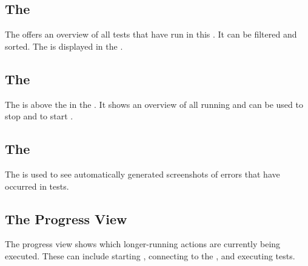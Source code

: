 \subsection{The \gdtestsummaryview{}}
The \gdtestsummaryview{} offers an overview of all tests that have run in this \gddb{}. It can be filtered and sorted.  The \gdtestsummaryview{} is displayed in the \reportpersp{}. 

\subsection{The \gdrunautview{}}
The \gdrunautview{} is above the \gdtestsuitebrowser{} in the \specpersp{}. It shows an overview of all running \gdauts{} and can be used to stop \gdauts{} and to start \gdsuites{}.  

\subsection{The \gdimgview{}}
The \gdimgview{} is used to see automatically generated screenshots of errors that have occurred in tests.

\subsection{The Progress View}
The progress view shows which longer-running actions are currently being executed. These can include starting \gdauts{}, connecting to the \gdagent{}, and executing tests.
